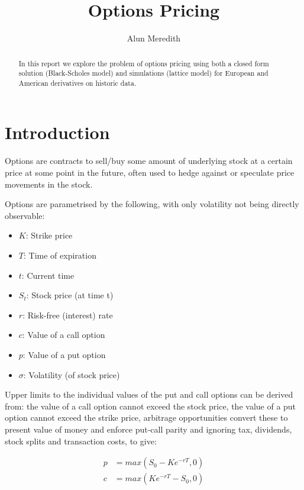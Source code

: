 \documentclass{sig-alternate-05-2015}
\begin{document}
\author{Alun Meredith\vspace{-2ex}%
}
\title{Options Pricing \vspace{-2ex}%
}
\maketitle

\begin{abstract}
In this report we explore the problem of options pricing using both a closed form solution (Black-Scholes model) and  simulations (lattice model) for European and American derivatives on historic data. 
\end{abstract}

\section{Introduction}
Options are contracts to sell/buy some amount of underlying stock at a certain price at some point in the future, often used to hedge against or speculate price movements in the stock. 

Options are parametrised by the following, with only volatility not being directly observable:
\begin{itemize}
 \item $K$: Strike price
 \item $T$: Time of expiration
 \item $t$: Current time
 \item $S_t$: Stock price (at time t)
 \item $r$: Risk-free (interest) rate
 \item $c$: Value of a call option
 \item $p$: Value of a put option
 \item $\sigma$: Volatility (of stock price)
\end{itemize}

Upper limits to the individual values of the put and call options can be derived from: the value of a call option cannot exceed the stock price, the value of a put option cannot exceed the strike price, arbitrage opportunities convert these to present value of money and enforce put-call parity and ignoring tax, dividends, stock splits and transaction costs, to give\cite{book1}:

\begin{align}
p &= max(S_0 - Ke^{-rT}, 0) \\
c &= max(Ke^{-rT}-S_0, 0)
\end{align}  
 
\end{document}
